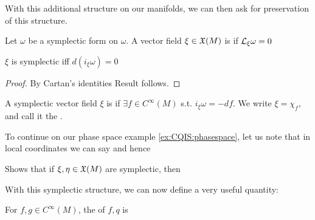 \documentclass{article}
\begin{document}
With this additional structure on our manifolds, we can then ask for preservation of this structure.

\begin{definition}
Let $\omega$ be a symplectic form on $\omega$. A vector field $\xi \in \mathfrak{X}(M)$ is  if $\mathcal{L}_\xi \omega = 0$
\end{definition}

\begin{prop}
$\xi $ is symplectic iff $d(i_\xi \omega) = 0$
\end{prop}
\begin{proof}
By Cartan's identities 
Result follows. 
\end{proof}

\begin{definition}
A symplectic vector field $\xi$ is  if $\exists f \in C^\infty(M)$ s.t. $i_\xi \omega = -df$. We write $\xi = \chi_f$, and call it the . 
\end{definition}

\begin{example}
To continue on our phase space example \ref{ex:CQIS:phasespace}, let us note that in local coordinates we can say 
and hence 
\end{example}

\begin{ex}
Shows that if $\xi,\eta\in \mathfrak{X}(M)$ are symplectic, then 
\eq{
\comm[\xi]{\eta} = \chi_{\omega(\xi,\eta)}
}
\end{ex}

With this symplectic structure, we can now define a very useful quantity:

\begin{definition}
For $f,g \in C^\infty(M)$, the  of $f,q$ is 
\end{definition}
\end{document}
